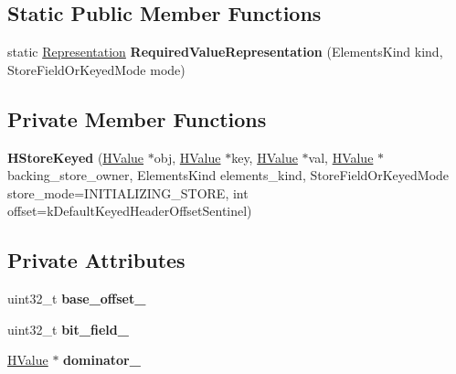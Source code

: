 \subsection*{Static Public Member Functions}
\begin{DoxyCompactItemize}
\item 
static \hyperlink{classv8_1_1internal_1_1_representation}{Representation} {\bfseries Required\+Value\+Representation} (Elements\+Kind kind, Store\+Field\+Or\+Keyed\+Mode mode)\hypertarget{classv8_1_1internal_1_1_h_store_keyed_a57c63ba2d7359d0fdd23858192a5cfbf}{}\label{classv8_1_1internal_1_1_h_store_keyed_a57c63ba2d7359d0fdd23858192a5cfbf}

\end{DoxyCompactItemize}
\subsection*{Private Member Functions}
\begin{DoxyCompactItemize}
\item 
{\bfseries H\+Store\+Keyed} (\hyperlink{classv8_1_1internal_1_1_h_value}{H\+Value} $\ast$obj, \hyperlink{classv8_1_1internal_1_1_h_value}{H\+Value} $\ast$key, \hyperlink{classv8_1_1internal_1_1_h_value}{H\+Value} $\ast$val, \hyperlink{classv8_1_1internal_1_1_h_value}{H\+Value} $\ast$backing\+\_\+store\+\_\+owner, Elements\+Kind elements\+\_\+kind, Store\+Field\+Or\+Keyed\+Mode store\+\_\+mode=I\+N\+I\+T\+I\+A\+L\+I\+Z\+I\+N\+G\+\_\+\+S\+T\+O\+RE, int offset=k\+Default\+Keyed\+Header\+Offset\+Sentinel)\hypertarget{classv8_1_1internal_1_1_h_store_keyed_a43e5b09296b4e557f57c00fc40424483}{}\label{classv8_1_1internal_1_1_h_store_keyed_a43e5b09296b4e557f57c00fc40424483}

\end{DoxyCompactItemize}
\subsection*{Private Attributes}
\begin{DoxyCompactItemize}
\item 
uint32\+\_\+t {\bfseries base\+\_\+offset\+\_\+}\hypertarget{classv8_1_1internal_1_1_h_store_keyed_a5fc653279963b0d4c219a6333c651c16}{}\label{classv8_1_1internal_1_1_h_store_keyed_a5fc653279963b0d4c219a6333c651c16}

\item 
uint32\+\_\+t {\bfseries bit\+\_\+field\+\_\+}\hypertarget{classv8_1_1internal_1_1_h_store_keyed_a5a1a5b4ba0c1e854150e5604f30080a0}{}\label{classv8_1_1internal_1_1_h_store_keyed_a5a1a5b4ba0c1e854150e5604f30080a0}

\item 
\hyperlink{classv8_1_1internal_1_1_h_value}{H\+Value} $\ast$ {\bfseries dominator\+\_\+}\hypertarget{classv8_1_1internal_1_1_h_store_keyed_a02131dfaa9eff696d987937186fdb015}{}\label{classv8_1_1internal_1_1_h_store_keyed_a02131dfaa9eff696d987937186fdb015}

\end{DoxyCompactItemize}
